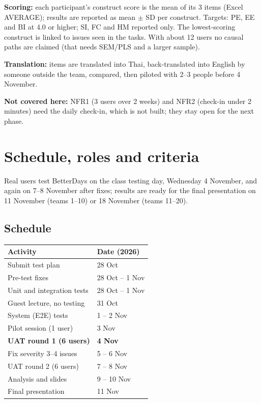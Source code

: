 \documentclass{article}
\begin{document}
\textbf{Scoring:} each participant's construct score is the mean of its 3 items (Excel AVERAGE); results are reported as mean $\pm$ SD per construct. Targets: PE, EE and BI at 4.0 or higher; SI, FC and HM reported only. The lowest-scoring construct is linked to issues seen in the tasks. With about 12 users no causal paths are claimed (that needs SEM/PLS and a larger sample).

\textbf{Translation:} items are translated into Thai, back-translated into English by someone outside the team, compared, then piloted with 2--3 people before 4 November.

\textbf{Not covered here:} NFR1 (3 users over 2 weeks) and NFR2 (check-in under 2 minutes) need the daily check-in, which is not built; they stay open for the next phase.

\section{Schedule, roles and criteria}

Real users test BetterDays on the class testing day, Wednesday 4 November, and again on 7--8 November after fixes; results are ready for the final presentation on 11 November (teams 1--10) or 18 November (teams 11--20).

\subsection{Schedule}

\begin{center}
\small
\begin{tabular}{|l|l|}
\hline
\textbf{Activity} & \textbf{Date (2026)} \\ \hline
Submit test plan & 28 Oct \\ \hline
Pre-test fixes & 28 Oct -- 1 Nov \\ \hline
Unit and integration tests & 28 Oct -- 1 Nov \\ \hline
Guest lecture, no testing & 31 Oct \\ \hline
System (E2E) tests & 1 -- 2 Nov \\ \hline
Pilot session (1 user) & 3 Nov \\ \hline
\textbf{UAT round 1 (6 users)} & \textbf{4 Nov} \\ \hline
Fix severity 3--4 issues & 5 -- 6 Nov \\ \hline
UAT round 2 (6 users) & 7 -- 8 Nov \\ \hline
Analysis and slides & 9 -- 10 Nov \\ \hline
Final presentation & 11 Nov \\ \hline
\end{tabular}
\end{center}
\end{document}
